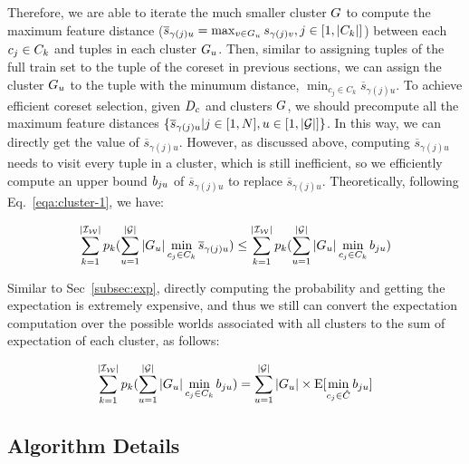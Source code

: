 Therefore,  we are able to iterate the much smaller cluster $G$ to compute  the maximum feature distance (\ie $\overline{s}_{\gamma(j)u} = \max_{v \in G_u}s_{\gamma(j)v}, j \in [1,|C_k|]$) between each $c_j \in C_k$ and tuples in each cluster $G_u$. Then, similar to assigning tuples of the full train set to the tuple of the coreset in previous sections, we can assign the cluster $G_u$ to the tuple  with the minumum distance, \ie $\min_{c_j\in C_k} \overline{s}_{\gamma(j)u}$. To achieve efficient coreset selection, given $D_c$ and clusters $G$, we should precompute all the maximum feature distances $\{\overline{s}_{\gamma(j)u}|j \in [1,N], u \in [1,|\mathcal{G}|]\}$. In this way, we can directly get the value of $\overline{s}_{\gamma(j)u}$. However, as discussed above, computing $\overline{s}_{\gamma(j)u}$ needs to visit every tuple in a cluster, which is still inefficient, so we  efficiently compute an upper bound $b_{ju}$ of  $\overline{s}_{\gamma(j)u}$ to replace $\overline{s}_{\gamma(j)u}$. Theoretically, following Eq.~\ref{eqa:cluster-1}, we have:

\begin{equation}\label{eqa:cluster-3}
    \begin{aligned}
        \sum_{k= 1}^{|\mathcal{I_W}|} p_k (\sum_{u=1}^{|\mathcal{G}|} |G_u| \min_{c_j\in C_k} \overline{s}_{\gamma(j)u}) \leq \sum_{k= 1}^{|\mathcal{I_W}|} p_k (\sum_{u=1}^{|\mathcal{G}|} |G_u| \min_{c_j\in C_k} b_{ju})
    \end{aligned}
\end{equation}

Similar to Sec~\ref{subsec:exp}, directly computing the probability and getting the expectation is extremely expensive, and thus we still can convert the expectation computation over the possible worlds associated with all clusters to the sum of expectation of each cluster, as follows:

\begin{equation}\label{eqa:cluster-4}
    \begin{aligned}
        \sum_{k= 1}^{|\mathcal{I_W}|} p_k (\sum_{u=1}^{|\mathcal{G}|} |G_u| \min_{c_j\in C_k} b_{ju}) = \sum_{u=1}^{|\mathcal{G}|}  |G_u| \times\mathrm{E}[\min_{c_j\in \hat{C}}b_{ju}]
    \end{aligned}
\end{equation}

\subsection{Algorithm Details}


